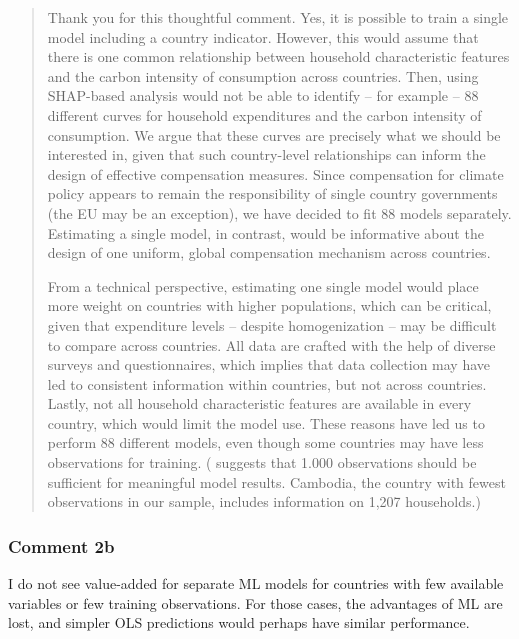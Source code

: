 \documentclass[11pt]{article}
\newenvironment{response}
{\begin{quote}\color{black}}
{\end{quote}}
\begin{document}
\begin{response}
    Thank you for this thoughtful comment. Yes, it is possible to train a single model including a country indicator. However, this would assume that there is one common relationship between household characteristic features and the carbon intensity of consumption across countries. Then, using SHAP-based analysis would not be able to identify -- for example -- 88 different curves for household expenditures and the carbon intensity of consumption. We argue that these curves are precisely what we should be interested in, given that such country-level relationships can inform the design of effective compensation measures. Since compensation for climate policy appears to remain the responsibility of single country governments (the EU may be an exception), we have decided to fit 88 models separately. Estimating a single model, in contrast, would be informative about the design of one uniform, global compensation mechanism across countries. 

    From a technical perspective, estimating one single model would place more weight on countries with higher populations, which can be critical, given that expenditure levels -- despite homogenization -- may be difficult to compare across countries. All data are crafted with the help of diverse surveys and questionnaires, which implies that data collection may have led to consistent information within countries, but not across countries. Lastly, not all household characteristic features are available in every country, which would limit the model use. These reasons have led us to perform 88 different models, even though some countries may have less observations for training. (\textcite{Elith.2008} suggests that 1.000 observations should be sufficient for meaningful model results. Cambodia, the country with fewest observations in our sample, includes information on 1,207 households.)
\end{response}

\subsubsection*{Comment 2b}\label{comment_R2_2b}

\begin{commentbox}
    I do not see value-added for separate ML models for countries with few available variables or few training observations. For those cases, the advantages of ML are lost, and simpler OLS predictions would perhaps have similar performance.
\end{commentbox}
\end{document}
